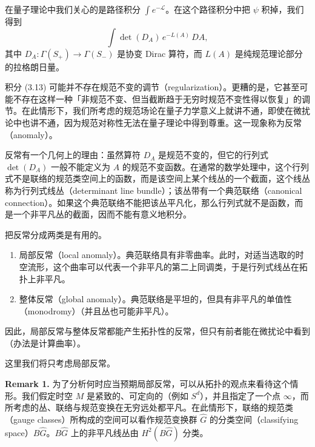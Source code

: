 在量子理论中我们关心的是路径积分 $\int e^{-\mathcal L}$。在这个路径积分中把 $\psi$ 积掉，我们得到
\begin{equation}
  \tag{3.13}
  \label{eq:3-13}
  \int\det(D_A)\,e^{-L(A)}\,DA,
\end{equation}
其中 $D_A:\Gamma(S_+)\to\Gamma(S_-)$ 是协变 Dirac 算符，而 $L(A)$ 是纯规范理论部分的拉格朗日量。


积分 (3.13) 可能并不存在规范不变的调节（regularization）。更糟的是，它甚至可能不存在这样一种「非规范不变、但当截断趋于无穷时规范不变性得以恢复」的调节。在此情形下，我们所考虑的规范场论在量子力学意义上就讲不通，即使在微扰论中也讲不通，因为规范对称性无法在量子理论中得到尊重。这一现象称为反常（anomaly）。

反常有一个几何上的理由：虽然算符 $D_A$ 是规范不变的，但它的行列式 $\det(D_A)$ 一般不能定义为 $A$ 的规范不变函数。在通常的数学处理中，这个行列式不是联络的规范类空间上的函数，而是该空间上某个线丛的一个截面，这个线丛称为行列式线丛（determinant line bundle）；该丛带有一个典范联络（canonical connection）。如果这个典范联络不能把该丛平凡化，那么行列式就不是函数，而是一个非平凡丛的截面，因而不能有意义地积分。

把反常分成两类是有用的。

\begin{enumerate}
\item 局部反常（local anomaly）。典范联络具有非零曲率。此时，对适当选取的时空流形，这个曲率可以代表一个非平凡的第二上同调类，于是行列式线丛在拓扑上非平凡。
\item 整体反常（global anomaly）。典范联络是平坦的，但具有非平凡的单值性（monodromy）（并且丛也可能非平凡）。
\end{enumerate}

因此，局部反常与整体反常都能产生拓扑性的反常，但只有前者能在微扰论中看到（办法是计算曲率）。

这里我们将只考虑局部反常。

\textbf{Remark 1.} 为了分析何时应当预期局部反常，可以从拓扑的观点来看待这个情形。我们假定时空 $M$ 是紧致的、可定向的（例如 $S^d$），并且指定了一个点 $\infty$，而所考虑的丛、联络与规范变换在无穷远处都平凡。在此情形下，联络的规范类（gauge classes）所构成的空间可以看作规范变换群 $\hat G$ 的分类空间（classifying space）$B\hat G$。$B\hat G$ 上的非平凡线丛由 $H^2(B\hat G)$ 分类。


